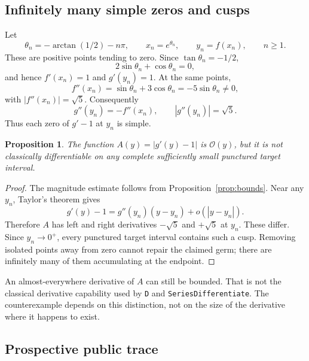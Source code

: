 \documentclass[11pt,a4paper]{article}
\newcommand{\code}[1]{\nolinkurl{#1}}
\newcommand{\OO}{\mathcal O}
\newtheorem{proposition}{Proposition}
\begin{document}
\subsection{Infinitely many simple zeros and cusps}

Let
\[
 \theta_n=-\arctan(1/2)-n\pi,\qquad
 x_n=e^{\theta_n},\qquad y_n=f(x_n),\qquad n\geq1.
\]
These are positive points tending to zero. Since $\tan\theta_n=-1/2$,
\[
 2\sin\theta_n+\cos\theta_n=0,
\]
and hence $f'(x_n)=1$ and $g'(y_n)=1$. At the same points,
\[
 f''(x_n)=\sin\theta_n+3\cos\theta_n
         =-5\sin\theta_n\neq0,
\]
with $|f''(x_n)|=\sqrt5$. Consequently
\begin{equation}\label{eq:inversezero}
 g''(y_n)=-f''(x_n),\qquad |g''(y_n)|=\sqrt5.
\end{equation}
Thus each zero of $g'-1$ at $y_n$ is simple.

\begin{proposition}\label{prop:cusps}
The function $A(y)=|g'(y)-1|$ is $\OO(y)$, but it is not classically differentiable on any complete sufficiently small punctured target interval.
\end{proposition}
\begin{proof}
The magnitude estimate follows from Proposition~\ref{prop:bounds}. Near any $y_n$, Taylor's theorem gives
\[
 g'(y)-1=g''(y_n)(y-y_n)+o(|y-y_n|).
\]
Therefore $A$ has left and right derivatives $-\sqrt5$ and $+\sqrt5$ at $y_n$. These differ. Since $y_n\to0^+$, every punctured target interval contains such a cusp. Removing isolated points away from zero cannot repair the claimed germ; there are infinitely many of them accumulating at the endpoint.
\end{proof}

An almost-everywhere derivative of $A$ can still be bounded. That is not the classical derivative capability used by \code{D} and \code{SeriesDifferentiate}. The counterexample depends on this distinction, not on the size of the derivative where it happens to exist.

\subsection{Prospective public trace}
\end{document}
